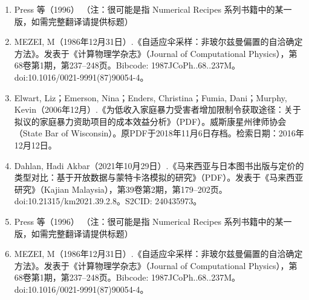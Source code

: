 \begin{enumerate}
\item Press 等（1996）
（注：很可能是指 Numerical Recipes 系列书籍中的某一版，如需完整翻译请提供标题）
\item MEZEI, M（1986年12月31日）.《自适应伞采样：非玻尔兹曼偏置的自洽确定方法》。发表于《计算物理学杂志》（Journal of Computational Physics），第68卷第1期，第237–248页。Bibcode: 1987JCoPh..68..237M。doi:10.1016/0021-9991(87)90054-4。
\item Elwart, Liz；Emerson, Nina；Enders, Christina；Fumia, Dani；Murphy, Kevin（2006年12月）.《为低收入家庭暴力受害者增加限制令获取途径：关于拟议的家庭暴力资助项目的成本效益分析》（PDF）。威斯康星州律师协会（State Bar of Wisconsin）。原PDF于2018年11月6日存档。检索日期：2016年12月12日。
\item Dahlan, Hadi Akbar（2021年10月29日）.《马来西亚与日本图书出版与定价的类型对比：基于开放数据与蒙特卡洛模拟的研究》（PDF）。发表于《马来西亚研究》（Kajian Malaysia），第39卷第2期，第179–202页。doi:10.21315/km2021.39.2.8。S2CID: 240435973。
\item Press 等（1996）
（注：很可能是指 Numerical Recipes 系列书籍中的某一版，如需完整翻译请提供标题）
\item MEZEI, M（1986年12月31日）.《自适应伞采样：非玻尔兹曼偏置的自洽确定方法》。发表于《计算物理学杂志》（Journal of Computational Physics），第68卷第1期，第237–248页。Bibcode: 1987JCoPh..68..237M。doi:10.1016/0021-9991(87)90054-4。
\end{enumerate}